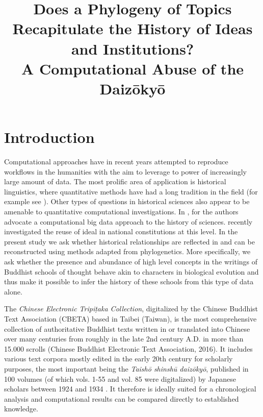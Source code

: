 \documentclass[a4paper,10pt]{article}
\title{Does a Phylogeny of Topics Recapitulate the History of Ideas and 
  Institutions? \\
  A Computational Abuse of the Daiz{\=o}ky{\=o}}
\date{}
\begin{document}
\maketitleabstract

\section{Introduction}

Computational approaches have in recent years attempted to reproduce
workflows in the humanities with the aim to leverage to power of
increasingly large amount of data. The most prolific area of application is
historical linguistics, where quantitative methods have had a long
tradition in the field (for example see 
\cite{levinson_tools_2012,gray_language-tree_2003,croft2008evolutionary}). 
Other types of questions in historical sciences also appear to be
amenable to quantitative computational investigations. In
\cite{Laubichler:13}, for the authors advocate a computational big data
approach to the history of sciences. \cite{Rockmore:16} recently
investigated the reuse of ideal in national constitutions at this level. In
the present study we ask whether historical relationships are reflected in
and can be reconstructed using methods adapted from phylogenetics. More
specifically, we ask whether the presence and abundance of high level concepts
in the writings of Buddhist schools of thought behave akin to characters in
biological evolution and thus make it possible to infer the history of
these schools from this type of data alone.

The \textit{Chinese Electronic Tripi{\d{t}}aka Collection}, digitalized by
the Chinese Buddhist Text Association (CBETA) based in Taibei (Taiwan), is
the most comprehensive collection of authoritative Buddhist texts written
in or translated into Chinese over many centuries from roughly in the late
2nd century A.D. in more than 15.000 scrolls (Chinese Buddhist Electronic
Text Association, 2016). It includes various text corpora mostly edited in
the early 20th century for scholarly purposes, the most important being the
\emph{Taish{\=o} shinsh{\=u} daiz{\=o}ky{\=o}}, published in 100 volumes
(of which vols. 1-55 and vol. 85 were digitalized) by Japanese scholars
between 1924 and 1934 \cite{Juniro:24-34}. It therefore is ideally suited
for a chronological analysis and computational results can be compared
directly to established knowledge.
\end{document}
